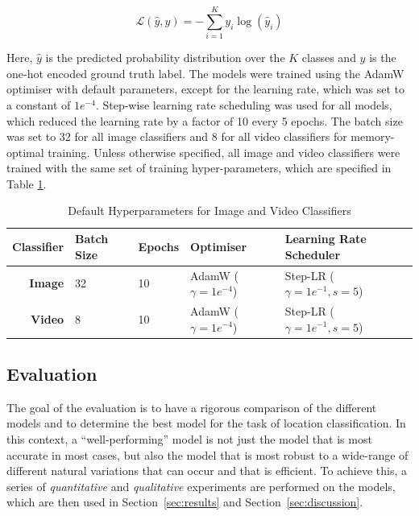 \documentclass[a4paper]{article}
\begin{document}
  \begin{equation}
    \mathcal{L}(\hat{y},y) = -\sum_{i=1}^{K} y_i \log(\hat{y}_i)
    \label{eq:cross-entropy}
  \end{equation}

  Here, $\hat{y}$ is the predicted probability distribution over the $K$ classes
  and $y$ is the one-hot encoded ground truth label. The models were trained
  using the AdamW~\cite{adamw} optimiser with default parameters, except for the
  learning rate, which was set to a constant of $1e^{-4}$. Step-wise learning
  rate scheduling was used for all models, which reduced the learning rate by a
  factor of 10 every 5 epochs. The batch size was set to 32 for all image
  classifiers and 8 for all video classifiers for memory-optimal training.
  Unless otherwise specified, all image and video classifiers were trained with
  the same set of training hyper-parameters, which are specified in Table
  \ref{tab:default-hyperparams}. 

  \begin{table}[ht]
    \centering
    \begin{tabular}{rllll}
      \toprule
      Classifier & Batch Size & Epochs & Optimiser & Learning Rate Scheduler \\
      \midrule
      \bfseries Image & 32 & 10 & AdamW ($\gamma=1e^{-4}$) & Step-LR
      ($\gamma=1e^{-1}, s=5$) \\
      \bfseries Video & 8 & 10 & AdamW ($\gamma=1e^{-4}$) & Step-LR
      ($\gamma=1e^{-1}, s=5$) \\
      \bottomrule
    \end{tabular}
    \caption{Default Hyperparameters for Image and Video Classifiers}
    \label{tab:default-hyperparams}
  \end{table}


  \subsection{Evaluation} %
  \label{sub:evaluation}

  The goal of the evaluation is to have a rigorous comparison of the different
  models and to determine the best model for the task of location
  classification. In this context, a ``well-performing'' model is not just the
  model that is most accurate in most cases, but also the model that is most
  robust to a wide-range of different natural variations that can occur and that
  is efficient. To achieve this, a series of \textit{quantitative} and
  \textit{qualitative} experiments are performed on the models, which are then
  used in Section~\ref{sec:results} and Section~\ref{sec:discussion}.
\end{document}
